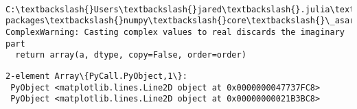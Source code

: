 \documentclass[11pt]{article}
\makeatletter
\newcommand{\boxspacing}{\kern\kvtcb@left@rule\kern\kvtcb@boxsep}
\newcommand{\prompt}[4]{
        \ttfamily\llap{{\color{#2}[#3]:\hspace{3pt}#4}}\vspace{-\baselineskip}
    }
\makeatother
\begin{document}
    \begin{center}
    \end{center}
    { \hspace*{\fill} \\}
    
    \begin{Verbatim}[commandchars=\\\{\}]
C:\textbackslash{}Users\textbackslash{}jared\textbackslash{}.julia\textbackslash{}conda\textbackslash{}3\textbackslash{}lib\textbackslash{}site-packages\textbackslash{}numpy\textbackslash{}core\textbackslash{}\_asarray.py:85:
ComplexWarning: Casting complex values to real discards the imaginary part
  return array(a, dtype, copy=False, order=order)
    \end{Verbatim}

            \begin{tcolorbox}[breakable, size=fbox, boxrule=.5pt, pad at break*=1mm, opacityfill=0]
\prompt{Out}{outcolor}{15}{\boxspacing}
\begin{Verbatim}[commandchars=\\\{\}]
2-element Array\{PyCall.PyObject,1\}:
 PyObject <matplotlib.lines.Line2D object at 0x0000000047737FC8>
 PyObject <matplotlib.lines.Line2D object at 0x00000000021B3BC8>
\end{Verbatim}
\end{tcolorbox}
        
\end{document}
